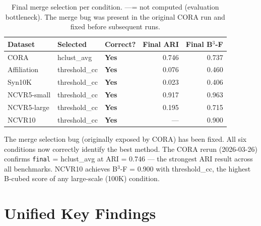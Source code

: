 \documentclass[11pt, a4paper]{article}
\newcommand{\good}[1]{{\color{good}\textbf{#1}}}
\newcommand{\na}{---}
\begin{document}
\begin{table}[h!]
\centering
\begin{tabular}{lllrr}
\toprule
\textbf{Dataset} & \textbf{Selected} & \textbf{Correct?} & \textbf{Final ARI} & \textbf{Final B$^3$-F} \\
\midrule
CORA          & hclust\_avg   & \good{Yes} & 0.746 & 0.737 \\
Affiliation   & threshold\_cc & \good{Yes} & 0.076 & 0.460 \\
Syn10K        & threshold\_cc & \good{Yes} & 0.023 & 0.406 \\
NCVR5-small   & threshold\_cc & \good{Yes} & 0.917 & 0.963 \\
NCVR5-large   & threshold\_cc & \good{Yes} & 0.195 & 0.715 \\
NCVR10        & threshold\_cc & \good{Yes} & \na   & 0.900 \\
\bottomrule
\end{tabular}
\caption{Final merge selection per condition. \na = not computed (evaluation bottleneck).
The merge bug was present in the original CORA run and fixed before subsequent runs.}
\end{table}

The merge selection bug (originally exposed by CORA) has been fixed. All six
conditions now correctly identify the best method. The CORA rerun (2026-03-26)
confirms \texttt{final} = hclust\_avg at ARI = 0.746 --- the strongest ARI result
across all benchmarks. NCVR10 achieves B$^3$-F = 0.900 with threshold\_cc, the
highest B-cubed score of any large-scale (100K) condition.

\section{Unified Key Findings}
\end{document}
